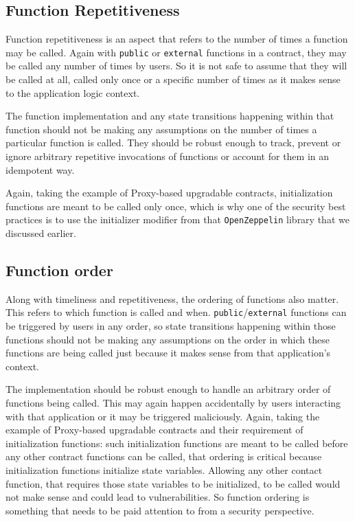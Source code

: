 \subsection{Function Repetitiveness}\label{function-repetitiveness}

Function repetitiveness is an aspect that refers to the number of times
a function may be called. Again with \texttt{public} or
\texttt{external} functions in a contract, they may be called any number
of times by users. So it is not safe to assume that they will be called
at all, called only once or a specific number of times as it makes sense
to the application logic context.

The function implementation and any state transitions happening within
that function should not be making any assumptions on the number of
times a particular function is called. They should be robust enough to
track, prevent or ignore arbitrary repetitive invocations of functions
or account for them in an idempotent way.

Again, taking the example of Proxy-based upgradable contracts,
initialization functions are meant to be called only once, which is why
one of the security best practices is to use the initializer modifier
from that \texttt{OpenZeppelin} library that we discussed earlier.

\subsection{Function order}\label{function-order}

Along with timeliness and repetitiveness, the ordering of functions also
matter. This refers to which function is called and when.
\texttt{public}/\texttt{external} functions can be triggered by users in
any order, so state transitions happening within those functions should
not be making any assumptions on the order in which these functions are
being called just because it makes sense from that application's
context.

The implementation should be robust enough to handle an arbitrary order
of functions being called. This may again happen accidentally by users
interacting with that application or it may be triggered maliciously.
Again, taking the example of Proxy-based upgradable contracts and their
requirement of initialization functions: such initialization functions
are meant to be called before any other contract functions can be
called, that ordering is critical because initialization functions
initialize state variables. Allowing any other contact function, that
requires those state variables to be initialized, to be called would not
make sense and could lead to vulnerabilities. So function ordering is
something that needs to be paid attention to from a security
perspective.

